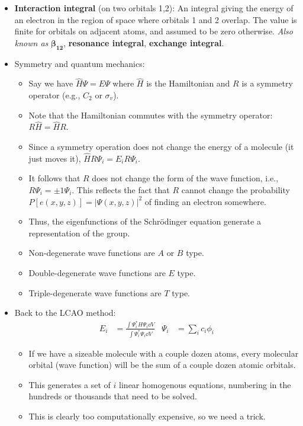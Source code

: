\documentclass[../notes.tex]{subfiles}
\begin{document}
\begin{itemize}
    \item \textbf{Interaction integral} (on two orbitals 1,2): An integral giving the energy of an electron in the region of space where orbitals 1 and 2 overlap. The value is finite for orbitals on adjacent atoms, and assumed to be zero otherwise. \emph{Also known as} $\bm{\beta_{12}}$, \textbf{resonance integral}, \textbf{exchange integral}.
    \item Symmetry and quantum mechanics:
    \begin{itemize}
        \item Say we have $\hat{H}\Psi=E\Psi$ where $\hat{H}$ is the Hamiltonian and $R$ is a symmetry operator (e.g., $C_2$ or $\sigma_v$).
        \item Note that the Hamiltonian commutes with the symmetry operator: $R\hat{H}=\hat{H}R$.
        \item Since a symmetry operation does not change the energy of a molecule (it just moves it), $\hat{H}R\Psi_i=E_iR\Psi_i$.
        \item It follows that $R$ does not change the form of the wave function, i.e., $R\Psi_i=\pm 1\Psi_i$. This reflects the fact that $R$ cannot change the probability $P[e(x,y,z)]=|\Psi(x,y,z)|^2$ of finding an electron somewhere.
        \item Thus, the eigenfunctions of the Schr\"{o}dinger equation generate a representation of the group.
        \item Non-degenerate wave functions are $A$ or $B$ type.
        \item Double-degenerate wave functions are $E$ type.
        \item Triple-degenerate wave functions are $T$ type.
    \end{itemize}
    \item Back to the LCAO method:
    \begin{align*}
        E_i &= \frac{\int\Psi_i^*H\Psi_i\dd{V}}{\int\Psi_i^*\Psi_i\dd{V}}&
            \Psi_i &= \sum_ic_i\phi_i
    \end{align*}
    \begin{itemize}
        \item If we have a sizeable molecule with a couple dozen atoms, every molecular orbital (wave function) will be the sum of a couple dozen atomic orbitals.
        \item This generates a set of $i$ linear homogenous equations, numbering in the hundreds or thousands that need to be solved.
        \item This is clearly too computationally expensive, so we need a trick.

\end{itemize}
\end{itemize}
\end{document}
